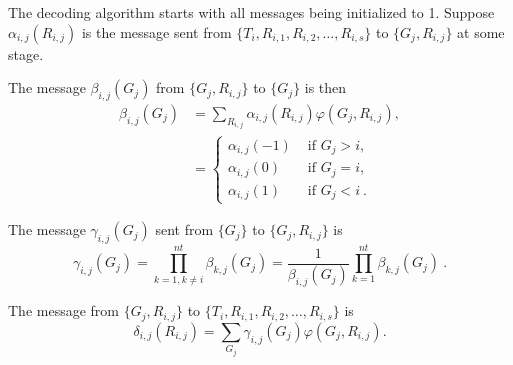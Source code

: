 The decoding algorithm starts with all messages being  initialized
to 1. Suppose $\alpha_{i,j}(R_{i,j})$ is the message sent from
$\{T_i, R_{i,1},R_{i,2},\dots, R_{i,s}\}$ to $\{G_j,R_{i,j}\}$ at
some stage.

The message $\beta_{i,j}(G_j)$ from $\{G_j,R_{i,j}\}$ to $\{G_j\}$
is then
\begin{eqnarray*}
\beta_{i,j}(G_j)&=\sum_{R_{i,j}}\alpha_{i,j}(R_{i,j})\varphi
(G_j,R_{i,j}),\\
{}&=\left\{ \begin{array}{ccc}\alpha_{i,j}(-1) & \text{ if }
G_j>i,\\
\alpha_{i,j}(0) & \text{ if }
G_j=i,\\
\alpha_{i,j}(1) & \text{ if } G_j<i~.
\end{array}\right.
\end{eqnarray*}

The message $\gamma_{i,j}(G_j)$ sent from $\{G_j\}$ to
$\{G_j,R_{i,j}\}$ is
\begin{equation}
\gamma_{i,j}(G_j)=\prod_{k=1,k\neq
i}^{nt}\beta_{k,j}(G_j)=\frac{1}{\beta_{i,j}(G_j)}\prod_{k=1}^{nt}\beta_{k,j}(G_j)~.
\end{equation}

The message from $\{G_j,R_{i,j}\}$ to $\{T_i, R_{i,1},R_{i,2},\dots,
R_{i,s}\}$  is
\begin{equation}
\delta_{i,j}(R_{i,j})=\sum_{G_j}\gamma_{i,j}(G_j)\varphi(G_j,R_{i,j}).
\end{equation}

